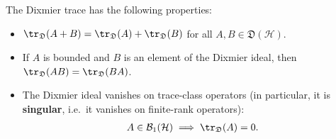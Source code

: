     \begin{property}
        The Dixmier trace has the following properties:
        \begin{itemize}
            \item $\tr_\mathfrak{D}(A+B)=\tr_\mathfrak{D}(A) + \tr_\mathfrak{D}(B)$ for all $A,B\in\mathfrak{D}(\mathcal{H})$.
            \item If $A$ is bounded and $B$ is an element of the Dixmier ideal, then $\tr_\mathfrak{D}(AB)=\tr_\mathfrak{D}(BA)$.
            \item The Dixmier ideal vanishes on trace-class operators (in particular, it is \textbf{singular}, i.e.~it vanishes on finite-rank operators):
                \begin{gather}
                    A\in\mathcal{B}_1(\mathcal{H})\implies\tr_\mathfrak{D}(A)=0.
                \end{gather}
        \end{itemize}
    \end{property}